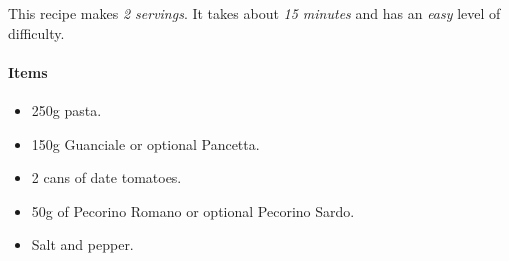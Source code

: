 This recipe makes \emph{2 servings}. It takes about \emph{15 minutes} and has an \emph{easy} level of difficulty. 

\paragraph{Items}
\begin{itemize}[noitemsep]
    \item[\ding{182}] 250g pasta.
    \item[\ding{183}] 150g Guanciale or optional Pancetta.
    \item[\ding{184}] 2 cans of date tomatoes.
    \item[\ding{185}] 50g of Pecorino Romano or optional Pecorino Sardo.
    \item[\ding{186}] Salt and pepper.
\end{itemize}

